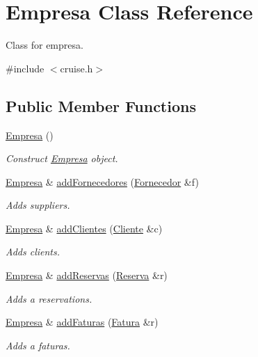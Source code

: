 \hypertarget{classEmpresa}{}\section{Empresa Class Reference}
\label{classEmpresa}


Class for empresa.  




{\ttfamily \#include $<$cruise.\+h$>$}

\subsection*{Public Member Functions}
\begin{DoxyCompactItemize}
\item 
\hyperlink{classEmpresa_aff124b958356c479ab50ddf4cf302193}{Empresa} ()
\begin{DoxyCompactList}\small\item\em Construct \hyperlink{classEmpresa}{Empresa} object. \end{DoxyCompactList}\item 
\hyperlink{classEmpresa}{Empresa} \& \hyperlink{classEmpresa_a0c858479d6e92094adbb2fc085039376}{add\+Fornecedores} (\hyperlink{classFornecedor}{Fornecedor} \&f)
\begin{DoxyCompactList}\small\item\em Adds suppliers. \end{DoxyCompactList}\item 
\hyperlink{classEmpresa}{Empresa} \& \hyperlink{classEmpresa_a57597ec4154f274686bc648ccf5d2a59}{add\+Clientes} (\hyperlink{classCliente}{Cliente} \&c)
\begin{DoxyCompactList}\small\item\em Adds clients. \end{DoxyCompactList}\item 
\hyperlink{classEmpresa}{Empresa} \& \hyperlink{classEmpresa_a42a1671b234ab8380cfb2ed33517edb2}{add\+Reservas} (\hyperlink{classReserva}{Reserva} \&r)
\begin{DoxyCompactList}\small\item\em Adds a reservations. \end{DoxyCompactList}\item 
\hyperlink{classEmpresa}{Empresa} \& \hyperlink{classEmpresa_a89c034ba48b716dfe61724e38eb0afbb}{add\+Faturas} (\hyperlink{classFatura}{Fatura} \&r)
\begin{DoxyCompactList}\small\item\em Adds a faturas. \end{DoxyCompactList}\item 

\end{DoxyCompactItemize}
